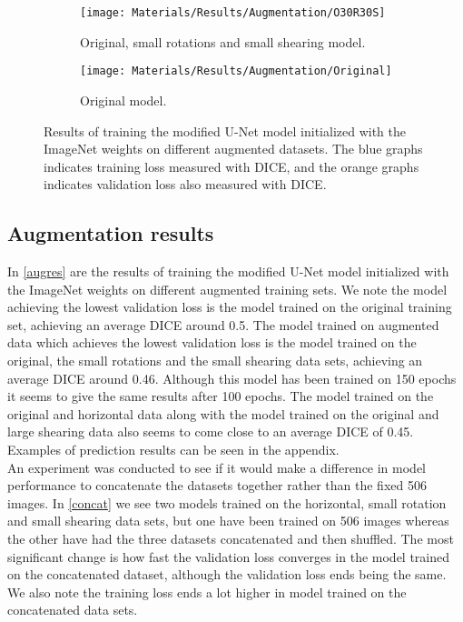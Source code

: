 \begin{figure}[H]
\begin{subfigure}[b]{0.19\linewidth}
	\end{subfigure}
	\hfill
	\begin{subfigure}[b]{0.19\linewidth}
		\centering
		\texttt{[image: Materials/Results/Augmentation/O30R30S]}
		\caption{Original, small rotations and small shearing model.\newline}
	\end{subfigure}
	\hfill
	\begin{subfigure}[b]{0.19\linewidth}
		\centering
		\texttt{[image: Materials/Results/Augmentation/Original]}
		\caption{Original model.\newline\newline\newline}
	\end{subfigure}
	\caption{Results of training the modified U-Net model initialized with the ImageNet weights on different augmented datasets. The blue graphs indicates training loss measured with DICE, and the orange graphs indicates validation loss also measured with DICE.}
	\label{augres}
\end{figure}

\subsection{Augmentation results}
In \autoref{augres} are the results of training the modified U-Net model initialized with the ImageNet weights on different augmented training sets. We note the model achieving the lowest validation loss is the model trained on the original training set, achieving an average DICE around 0.5. The model trained on augmented data which achieves the lowest validation loss is the model trained on the original, the small rotations and the small shearing data sets, achieving an average DICE around 0.46. Although this model has been trained on 150 epochs it seems to give the same results after 100 epochs. The model trained on the original and horizontal data along with the model trained on the original and large shearing data also seems to come close to an average DICE of 0.45. Examples of prediction results can be seen in the appendix.\\
An experiment was conducted to see if it would make a difference in model performance to concatenate the datasets together rather than the fixed 506 images. In \autoref{concat} we see two models trained on the horizontal, small rotation and small shearing data sets, but one have been trained on 506 images whereas the other have had the three datasets concatenated and then shuffled. The most significant change is how fast the validation loss converges in the model trained on the concatenated dataset, although the validation loss ends being the same. We also note the training loss ends a lot higher in model trained on the concatenated data sets.

